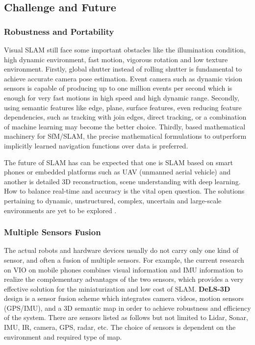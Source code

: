 \documentclass[journal,transmag]{IEEEtran}
\begin{document}
\subsection{Challenge and Future}
\subsubsection{Robustness and Portability}
Visual SLAM still face some important obstacles like the illumination condition, high dynamic environment, fast motion, vigorous rotation and low texture environment. Firstly, global shutter instead of rolling shutter is fundamental to achieve accurate camera pose estimation. Event camera such as dynamic vision sensors is capable of producing up to one million events per second which is enough for very fast motions in high speed and high dynamic range. Secondly, using semantic features like edge, plane, surface features, even reducing feature dependencies, such as tracking with join edges, direct tracking, or a combination of machine learning may become the better choice. Thirdly, based mathematical machinery for SfM/SLAM, the precise mathematical formulations to outperform implicitly learned navigation functions over data is preferred.

The future of SLAM has can be expected that one is SLAM based on smart phones or embedded platforms such as UAV (unmanned aerial vehicle) and another is detailed 3D reconstruction, scene understanding with deep learning.  How to balance real-time and accuracy is the vital open question. The solutions pertaining to dynamic, unstructured, complex, uncertain and large-scale environments are yet to be explored \cite{sualeh2019simultaneous}.
\subsubsection{Multiple Sensors Fusion}
The actual robots and hardware devices usually do not carry only one kind of sensor, and often a fusion of multiple sensors. For example, the current research on VIO on mobile phones combines visual information and IMU information to realize the complementary advantages of the two sensors, which provides a very effective solution for the miniaturization and low cost of SLAM. \textbf{DeLS-3D} \cite{wang2018dels} design is a sensor fusion scheme which integrates camera videos, motion sensors (GPS/IMU), and a 3D semantic map in order to achieve robustness and efficiency of the system. There are sensors listed as follows but not limited to Lidar, Sonar, IMU, IR, camera, GPS, radar, etc. The choice of sensors is dependent on the environment and required type of map.
\end{document}
